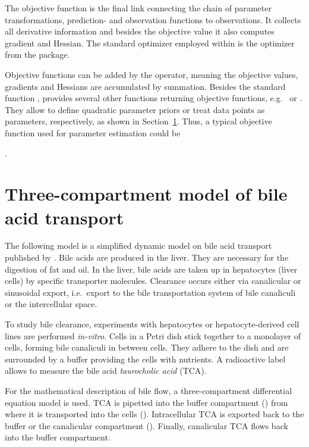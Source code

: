 \documentclass[article]{jss}
\begin{document}
The objective function is the final link connecting the chain of parameter transformations, prediction- and observation functions to observations. It collects all derivative information and besides the objective value it also computes gradient and Hessian. The standard optimizer employed within  is the  optimizer from the  package.

Objective functions can be added by the  operator, meaning the objective values, gradients and Hessians are accumulated by summation. Besides the standard function ,  provides several other functions returning objective functions, e.g.~ or . They allow to define quadratic parameter priors or treat data points as parameters, respectively, as shown in Section~\ref{sec:example}. Thus, a typical objective function used for parameter estimation could be
\begin{center}
	.
\end{center}


\section{Three-compartment model of bile acid transport}
\label{sec:example}

The following model is a simplified dynamic model on bile acid transport published by \cite{kaschek2017dynamic}. Bile acids are produced in the liver. They are necessary for the digestion of fat and oil. In the liver, bile acids are taken up in hepatocytes (liver cells) by specific transporter molecules. Clearance occurs either via canalicular or sinusoidal export, i.e.~export to the bile transportation system of bile canaliculi or the intercellular space.

To study bile clearance, experiments with hepatocytes or hepatocyte-derived cell lines are performed \textit{in-vitro}. Cells in a Petri dish stick together to a monolayer of cells, forming bile canaliculi in between cells. They adhere to the dish and are surrounded by a buffer providing the cells with nutrients. A radioactive label allows to measure the bile acid \textit{taurocholic acid} (TCA).

For the mathematical description of bile flow, a three-compartment differential equation model is used. TCA is pipetted into the buffer compartment () from where it is transported into the cells (). Intracellular TCA is exported back to the buffer or the canalicular compartment (). Finally, canalicular TCA flows back into the buffer compartment. 
\end{document}
